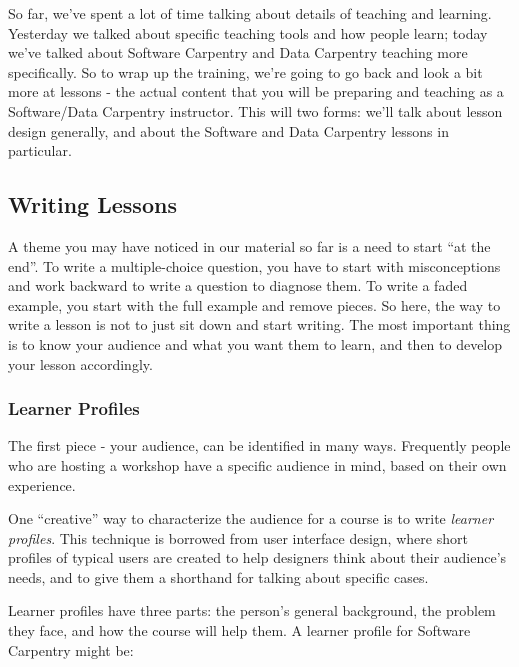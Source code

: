 
So far, we've spent a lot of time talking about details of teaching and
learning.
Yesterday we talked about specific teaching tools and how
people learn; today we've talked about Software Carpentry and Data
Carpentry teaching more specifically.
So to wrap up the training, we're
going to go back and look a bit more at lessons - the actual content
that you will be preparing and teaching as a Software/Data Carpentry
instructor. This will two forms: we'll talk about lesson design
generally, and about the Software and Data Carpentry lessons in
particular.

\subsection{Writing Lessons}\label{writing-lessons}

A theme you may have noticed in our material so far is a need to start
``at the end''. To write a multiple-choice question, you have to start
with
misconceptions and work backward to write a question to diagnose
them. To write a faded example, you start with the full example and
remove pieces. So here, the way to write a lesson is not to just sit
down and start writing. The most important thing is to know your
audience and what you want them to learn, and then to develop your
lesson accordingly.

\subsubsection{Learner Profiles}\label{learner-profiles}

The first piece - your audience, can be identified in many ways.
Frequently people who are hosting a workshop have a specific audience in
mind, based on their own experience.

One ``creative'' way to characterize the audience for a course is to
write \emph{learner profiles}. This technique is borrowed from user
interface design, where short profiles of typical users are created to
help designers think about their audience's needs, and to give them a
shorthand for talking about specific cases.

Learner profiles have three parts: the person's general background, the
problem they face, and how the course will help them. A learner profile
for Software Carpentry might be:

